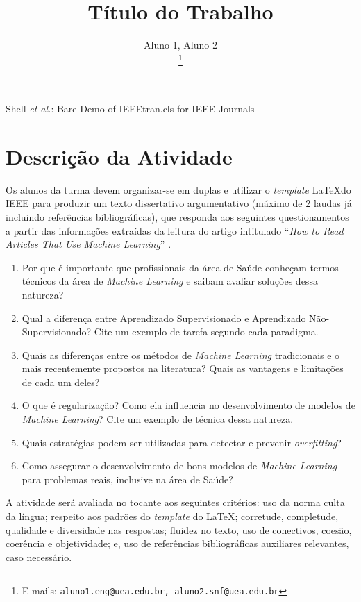 \documentclass[journal]{IEEEtran}
\begin{document}
\title{Título do Trabalho}


\author{Aluno 1, Aluno 2\\
\thanks{E-mails: \texttt{aluno1.eng@uea.edu.br, aluno2.snf@uea.edu.br}}}

%
{Shell \MakeLowercase{\textit{et al.}}: Bare Demo of IEEEtran.cls for IEEE Journals}
\maketitle
\IEEEpeerreviewmaketitle

\section{Descrição da Atividade}

Os alunos da turma devem organizar-se em duplas e utilizar o \emph{template} \LaTeX do IEEE para produzir um texto dissertativo argumentativo (máximo de $2$ laudas já incluindo referências bibliográficas), que responda aos seguintes questionamentos a partir das informações extraídas da leitura do artigo intitulado ``\emph{How to Read Articles That Use Machine Learning}'' \cite{Liu2019}.

\begin{enumerate}
    \item Por que é importante que profissionais da área de Saúde conheçam termos técnicos da área de \emph{Machine Learning} e saibam avaliar soluções dessa natureza?
    \item Qual a diferença entre Aprendizado Supervisionado e Aprendizado Não-Supervisionado? Cite um exemplo de tarefa segundo cada paradigma.
    \item Quais as diferenças entre os métodos de \emph{Machine Learning} tradicionais e o mais recentemente propostos na literatura? Quais as vantagens e limitações de cada um deles?
    \item O que é regularização?  Como ela influencia no desenvolvimento de modelos de \emph{Machine Learning}? Cite um exemplo de técnica dessa natureza.
    \item Quais estratégias podem ser utilizadas para detectar e prevenir \emph{overfitting}?
    \item Como assegurar o desenvolvimento de bons modelos de \emph{Machine Learning} para problemas reais, inclusive na área de Saúde?
\end{enumerate}

A atividade será avaliada no tocante aos seguintes critérios: uso da norma culta da língua; respeito aos padrões do \emph{template} do \LaTeX; corretude, completude, qualidade e diversidade nas respostas; fluidez no texto, uso de conectivos, coesão, coerência e objetividade; e, uso de referências bibliográficas auxiliares relevantes, caso necessário.









\end{document}
